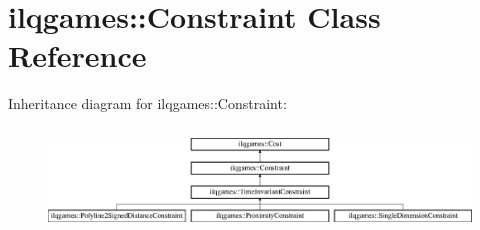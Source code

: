 \hypertarget{classilqgames_1_1_constraint}{}\section{ilqgames\+:\+:Constraint Class Reference}
\label{classilqgames_1_1_constraint}
Inheritance diagram for ilqgames\+:\+:Constraint\+:\begin{figure}[H]
\begin{center}
\leavevmode
\includegraphics[height=2.755228cm]{classilqgames_1_1_constraint}
\end{center}
\end{figure}
